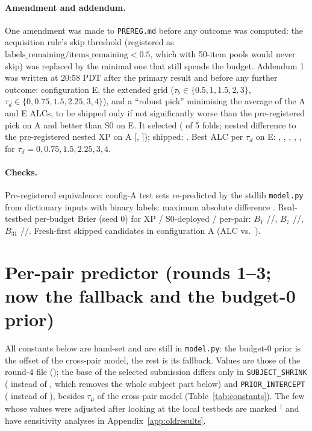 \documentclass{article}
\begin{document}
\paragraph{Amendment and addendum.} One amendment was made to \texttt{PREREG.md} before any outcome was computed: the acquisition rule's skip threshold (registered as $\text{labels\_remaining}/\text{items\_remaining}<0.5$, which with 50-item pools would never skip) was replaced by the minimal one that still spends the budget. Addendum 1 was written at 20:58 PDT after the primary result and before any further outcome: configuration E, the extended grid ($\tau_b\in\{0.5,1,1.5,2,3\}$, $\tau_d\in\{0,0.75,1.5,2.25,3,4\}$), and a ``robust pick'' minimising the average of the A and E ALCs, to be shipped only if not significantly worse than the pre-registered pick on A and better than S0 on E. It selected \XpRobSameAsPrereg{} (\XpRobNFoldsSame{} of 5 folds; nested difference to the pre-registered nested XP on A \XpCARobVsPreMean{} [\XpCARobVsPreLo, \XpCARobVsPreHi]); shipped: \XpShipSource. Best ALC per $\tau_d$ on E: \XpProfItemZeroE, \XpProfItemZeroSevenFiveE, \XpProfItemOneFiveE, \XpProfItemTwoTwoFiveE, \XpProfItemThreeE, \XpProfItemFourE{} for $\tau_d=0,0.75,1.5,2.25,3,4$.

\paragraph{Checks.} Pre-registered equivalence: \XpEquivNTestsets{} config-A test sets re-predicted by the stdlib \texttt{model.py} from dictionary inputs with binary labels: maximum absolute difference \XpEquivMaxDiff. Real-testbed per-budget Brier (seed 0) for XP / S0-deployed / per-pair: $B_1$ \XpRealXpBOne/\XpRealShipGlobalBOne/\XpRealShipPerPairBOne, $B_7$ \XpRealXpBSeven/\XpRealShipGlobalBSeven/\XpRealShipPerPairBSeven, $B_{31}$ \XpRealXpBThirtyOne/\XpRealShipGlobalBThirtyOne/\XpRealShipPerPairBThirtyOne. Fresh-first skipped \XpAcqSkips{} candidates in configuration A (ALC \XpAcqFreshAlc{} vs.\ \XpAcqRandomAlc).


\section{Per-pair predictor (rounds 1--3; now the fallback and the budget-0 prior)}
\label{app:perpair}


All constants below are hand-set and are still in \texttt{model.py}: the budget-0 prior is the offset of the cross-pair model, the rest is its fallback. Values are those of the round-4 file (\FmShipId); the base \SelId{} of the selected submission \SubId{} differs only in \texttt{SUBJECT\_SHRINK} (\SelSubjectShrink{} instead of \ShipSubjectShrink, which removes the whole subject part below) and \texttt{PRIOR\_INTERCEPT} (\SelIntercept{} instead of \ShipIntercept), besides $\tau_\mu$ of the cross-pair model (Table~\ref{tab:constants}). The few whose values were adjusted after looking at the local testbeds are marked $^\dagger$ and have sensitivity analyses in Appendix~\ref{app:oldresults}.
\end{document}
